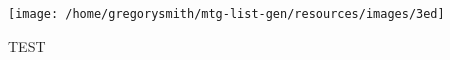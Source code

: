 \documentclass{memoir}
\begin{document}
    \renewcommand{\arraystretch}{3}
    \centering\texttt{[image: /home/gregorysmith/mtg-list-gen/resources/images/3ed]}
    \begin{center}
        \centering
        \begin{minipage}{1.95\textwidth}
            \vspace{2cm}
            \begin{multicols*}{4}
                TEST
            \end{multicols*}
        \end{minipage}
    \end{center}
\end{document}
